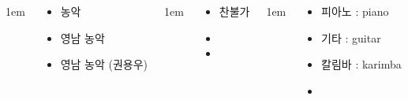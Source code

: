 \documentclass[	20pt, 
							a0paper, 
							landscape,
							margin=0mm, %
							innermargin=10mm,  		%
							blockverticalspace=4mm, %
							colspace=5mm, 
							subcolspace=0mm
							]{tikzposter}
\begin{document}
\begin{columns}

			{
					\setlength{\leftmargini}{4em}
					\setlength{\labelsep} {1em}
				\begin{LARGE}
					\begin{itemize}
					\item 농악
					\item 영남 농악
					\item 영남 농악 (권용우)
					\end{itemize}
				\end{LARGE}
			} %


			{
					\setlength{\leftmargini}{4em}
					\setlength{\labelsep} {1em}
				\begin{LARGE}
					\begin{itemize}
					\item 찬불가
					\item 
					\item 
					\end{itemize}
				\end{LARGE}
			} %







			{
					\setlength{\leftmargini}{3em}
					\setlength{\labelsep} {1em}
				\begin{LARGE}
					\begin{itemize}
					\item 피아노 : piano
					\item 기타 : guitar
					\item 칼림바 :  karimba
					\item 
					\end{itemize}
				\end{LARGE}
			} %






	\end{columns}
\end{document}
